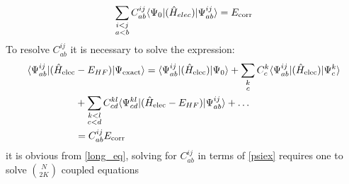         \begin{equation}
        \sum_{\substack{i<j \\ a<b}}C^{ij}_{ab}\langle\Psi_0 |(\hat{H}_{elec})| \Psi^{ij}_{ab} \rangle  = E_{\text{corr}}
        \end{equation}
      To resolve $C^{ij}_{ab}$ it is necessary to solve the expression:%
        \begin{equation}\label{long_eq}
        	\begin{aligned}
        		\langle\Psi^{ij}_{ab} |(\hat{H}_{\text{elec}} &- E_{HF})| \Psi_{\text{exact}} \rangle = \langle\Psi^{ij}_{ab} |(\hat{H}_{\text{elec}} )| \Psi_0 \rangle +  \sum_{\substack{k\\c}} C^k_c\langle\Psi^{ij}_{ab} |(\hat{H}_{\text{elec}} )| \Psi^k_c \rangle \\
      		&+  \sum_{\substack{k<l \\ c<d}}C^{kl}_{cd}\langle\Psi^{kl}_{cd} |(\hat{H}_{\text{elec}}-E_{HF})| \Psi^{ij}_{ab} \rangle  +\dots\\
          	&= C^{ij}_{ab}E_{\text{corr}}
        	\end{aligned}
        \end{equation}
      it is obvious from \cref{long_eq}, solving for $C_{ab}^{ij}$ in terms of \cref{psiex} requires one to solve $\binom{N}{2K}$ coupled equations
